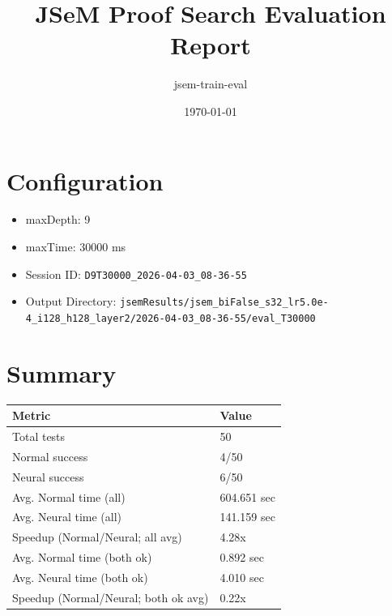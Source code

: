 \documentclass[a4paper,10pt]{article}
\title{JSeM Proof Search Evaluation Report}
\author{jsem-train-eval}
\date{\today}
\begin{document}
\maketitle

\section{Configuration}
\begin{itemize}
\item maxDepth: 9
\item maxTime: 30000 ms
\item Session ID: \texttt{D9T30000\_2026-04-03\_08-36-55}
\item Output Directory: \texttt{jsemResults/jsem\_biFalse\_s32\_lr5.0e-4\_i128\_h128\_layer2/2026-04-03\_08-36-55/eval\_T30000}
\end{itemize}

\section{Summary}
\begin{tabular}{ll}
\toprule
\textbf{Metric} & \textbf{Value} \\
\midrule
Total tests & 50 \\
Normal success & 4/50 \\
Neural success & 6/50 \\
\midrule
Avg. Normal time (all) & 604.651 sec \\
Avg. Neural time (all) & 141.159 sec \\
Speedup (Normal/Neural; all avg) & 4.28x \\
Avg. Normal time (both ok) & 0.892 sec \\
Avg. Neural time (both ok) & 4.010 sec \\
Speedup (Normal/Neural; both ok avg) & 0.22x \\
\bottomrule
\end{tabular}
\end{document}
